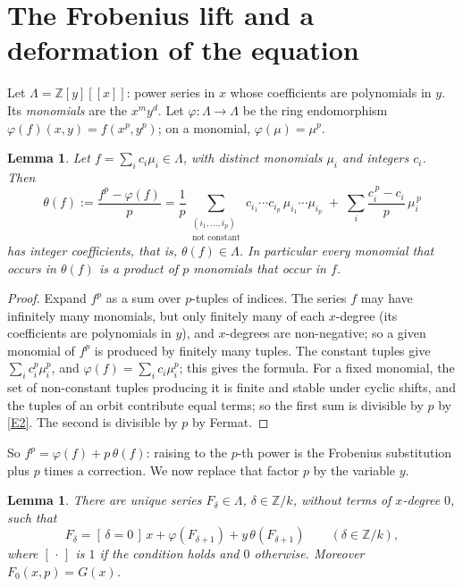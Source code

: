 \documentclass[11pt]{article}
\newtheorem{lemma}[theorem]{Lemma}
\theoremstyle{definition}
\theoremstyle{remark}
\newcommand{\Z}{\mathbb Z}
\newcommand{\br}[1]{[\,#1\,]}
\begin{document}
\section{The Frobenius lift and a deformation of the equation}

Let $\Lambda=\Z[y][[x]]$: power series in $x$ whose coefficients are polynomials in $y$. Its
\emph{monomials} are the $x^my^d$. Let $\varphi\colon\Lambda\to\Lambda$ be the ring
endomorphism $\varphi(f)(x,y)=f(x^p,y^p)$; on a monomial, $\varphi(\mu)=\mu^p$.

\begin{lemma}\label{lem:theta}
Let $f=\sum_ic_i\mu_i\in\Lambda$, with distinct monomials $\mu_i$ and integers $c_i$. Then
\begin{equation}\label{eq:theta}
 \theta(f):=\frac{f^p-\varphi(f)}{p}
 =\frac1p\sum_{\substack{(i_1,\dots,i_p)\\ \text{not constant}}}
   c_{i_1}\cdots c_{i_p}\,\mu_{i_1}\cdots\mu_{i_p}
  \;+\;\sum_i\frac{c_i^{\,p}-c_i}{p}\,\mu_i^{\,p}
\end{equation}
has integer coefficients, that is, $\theta(f)\in\Lambda$. In particular every monomial that
occurs in $\theta(f)$ is a product of $p$ monomials that occur in $f$.
\end{lemma}

\begin{proof}
Expand $f^p$ as a sum over $p$-tuples of indices. The series $f$ may have infinitely many
monomials, but only finitely many of each $x$-degree (its coefficients are polynomials in
$y$), and $x$-degrees are non-negative; so a given monomial of $f^p$ is produced by finitely
many tuples. The constant tuples give $\sum_ic_i^p\mu_i^p$, and
$\varphi(f)=\sum_ic_i\mu_i^p$; this gives the formula. For a fixed monomial, the set of
non-constant tuples producing it is finite and stable under cyclic shifts, and the tuples of
an orbit contribute equal terms; so the first sum is divisible by $p$ by \ref{E2}. The second
is divisible by $p$ by Fermat.
\end{proof}

So $f^p=\varphi(f)+p\,\theta(f)$: raising to the $p$-th power is the Frobenius substitution
plus $p$ times a correction. We now replace that factor $p$ by the variable $y$.

\begin{lemma}\label{lem:system}
There are unique series $F_\delta\in\Lambda$, $\delta\in\Z/k$, without terms of $x$-degree
$0$, such that
\begin{equation}\label{eq:system}
 F_\delta=\br{\delta=0}\,x+\varphi(F_{\delta+1})+y\,\theta(F_{\delta+1})
 \qquad(\delta\in\Z/k),
\end{equation}
where $\br{\cdot}$ is $1$ if the condition holds and $0$ otherwise. Moreover
$F_0(x,p)=G(x)$.
\end{lemma}
\end{document}
